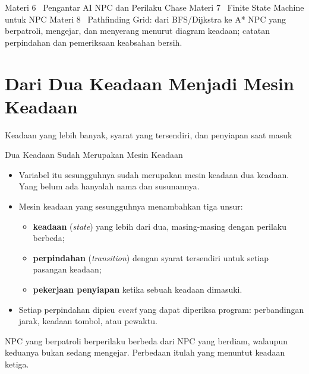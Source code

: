 \documentclass[aspectratio=169,10pt]{beamer}
\begin{document}
  {Materi 6 \textperiodcentered\ Pengantar AI NPC dan Perilaku Chase}
  {Materi 7 \textperiodcentered\ Finite State Machine untuk NPC}
  {Materi 8 \textperiodcentered\ Pathfinding Grid: dari BFS/Dijkstra ke A*}
  {NPC yang berpatroli, mengejar, dan menyerang menurut diagram keadaan;
   catatan perpindahan dan pemeriksaan keabsahan bersih.}

\section{Dari Dua Keadaan Menjadi Mesin Keadaan}
  {Keadaan yang lebih banyak, syarat yang tersendiri, dan penyiapan saat masuk}

\begin{frame}{Dua Keadaan Sudah Merupakan Mesin Keadaan}
\begin{itemize}
  \item Variabel itu sesungguhnya sudah merupakan mesin keadaan dua keadaan.
        Yang belum ada hanyalah nama dan susunannya.
  \item Mesin keadaan yang sesungguhnya menambahkan tiga unsur:
        \begin{itemize}
          \item \textbf{keadaan} (\emph{state}) yang lebih dari dua,
                masing-masing dengan perilaku berbeda;
          \item \textbf{perpindahan} (\emph{transition}) dengan syarat
                tersendiri untuk setiap pasangan keadaan;
          \item \textbf{pekerjaan penyiapan} ketika sebuah keadaan dimasuki.
        \end{itemize}
  \item Setiap perpindahan dipicu \emph{event} yang dapat diperiksa program:
        perbandingan jarak, keadaan tombol, atau pewaktu.
\end{itemize}
\vspace{0.12cm}
\begin{kotak}
NPC yang berpatroli berperilaku berbeda dari NPC yang berdiam, walaupun keduanya
bukan sedang mengejar. Perbedaan itulah yang menuntut keadaan ketiga.
\end{kotak}
\end{frame}
\end{document}
